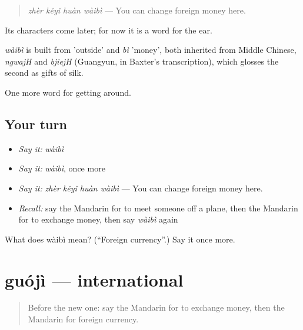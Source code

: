 \begin{quote}
\emph{zhèr kěyǐ huàn wàibì} — You can change foreign money here.
\end{quote}

Its characters come later; for now it is a word for the ear.

\begin{cousinweb}
\emph{wàibì} is built from  'outside' and \emph{bì} 'money', both inherited from Middle Chinese, \emph{ngwajH} and \emph{bjiejH} (Guangyun, in Baxter's transcription), which glosses the second as gifts of silk.
\end{cousinweb}

\begin{grammarlens}[title={What you've built}]
One more word for getting around.
\end{grammarlens}

\subsection*{Your turn}
\begin{itemize}
\raggedright
  \item \emph{Say it:} \emph{wàibì}
  \item \emph{Say it:} \emph{wàibì}, once more
  \item \emph{Say it:} \emph{zhèr kěyǐ huàn wàibì} — You can change foreign money here.
  \item \emph{Recall:} say the Mandarin for to meet someone off a plane, then the Mandarin for to exchange money, then say \emph{wàibì} again
\end{itemize}

\begin{tcolorbox}[breakable,colback=teal!4,colframe=teal!35!black,title={Before you move on}]
What does wàibì mean? (\textquotedblleft{}Foreign currency\textquotedblright{}.) Say it once more.
\end{tcolorbox}
\section[guójì]{guójì — international}

\label{lesson:ZH-C419-guoji}



\begin{quote}
Before the new one: say the Mandarin for to exchange money, then the Mandarin for foreign currency.
\end{quote}

